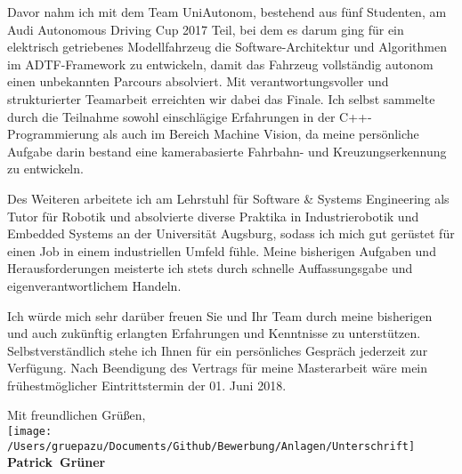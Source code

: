 \documentclass[10pt,a4paper]{article}
\def\firstname{Patrick}
\def\familyname{Grüner}
\begin{document}
Davor nahm ich mit dem Team UniAutonom, bestehend aus fünf Studenten, am Audi Autonomous Driving Cup 2017 Teil, bei dem es darum ging für ein elektrisch getriebenes Modellfahrzeug die Software-Architektur und Algorithmen im ADTF-Framework zu entwickeln, damit das Fahrzeug vollständig autonom einen unbekannten Parcours absolviert. Mit verantwortungsvoller und strukturierter Teamarbeit erreichten wir dabei das Finale. Ich selbst sammelte durch die Teilnahme sowohl einschlägige Erfahrungen in der C++-Programmierung als auch im Bereich Machine Vision, da meine persönliche Aufgabe darin bestand eine kamerabasierte Fahrbahn- und Kreuzungserkennung zu entwickeln.

Des Weiteren arbeitete ich am Lehrstuhl für Software \& Systems Engineering als Tutor für Robotik und absolvierte diverse Praktika in Industrierobotik und Embedded Systems an der Universität Augsburg, sodass ich mich gut gerüstet für einen Job in einem industriellen Umfeld fühle. Meine bisherigen Aufgaben und Herausforderungen meisterte ich stets durch schnelle Auffassungsgabe und eigenverantwortlichem Handeln.

Ich würde mich sehr darüber freuen Sie und Ihr Team durch meine bisherigen und auch zukünftig erlangten Erfahrungen und Kenntnisse zu unterstützen. Selbstverständlich stehe ich Ihnen für ein persönliches Gespräch jederzeit zur Verfügung. Nach Beendigung des Vertrags für meine Masterarbeit wäre mein frühestmöglicher Eintrittstermin der 01. Juni 2018.
  
Mit freundlichen Grüßen,\\[3em]

\texttt{[image: /Users/gruepazu/Documents/Github/Bewerbung/Anlagen/Unterschrift]}\\
{\bfseries \firstname~\familyname}\\
%
\vfill%
\end{document}
